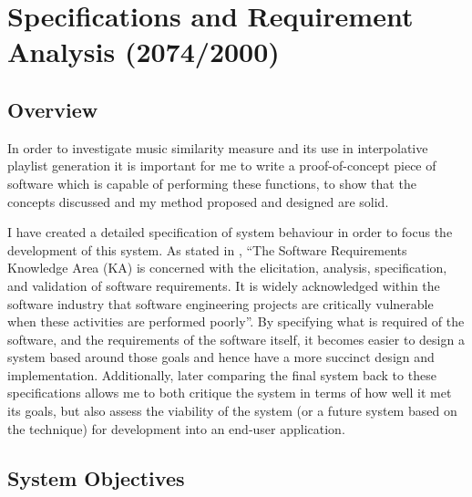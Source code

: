 %
%
\newcommand{\objective}[1]{
	\subsubsection{#1}
}
\chapter{Specifications and Requirement Analysis (2074/2000)}
\section{Overview}
In order to investigate music similarity measure and its use in interpolative playlist generation it is important for me to write a proof-of-concept piece of software which is capable of performing these functions, to show that the concepts discussed and my method proposed and designed are solid.

I have created a detailed specification of system behaviour in order to focus the development of this system. As stated in \citet{Bourque2004}, ``The Software Requirements Knowledge Area (KA) is concerned with the elicitation, analysis, specification, and validation of software requirements. It is widely acknowledged within the software industry that software engineering projects are critically vulnerable when these activities are performed poorly''. By specifying what is required of the software, and the requirements of the software itself, it becomes easier to design a system based around those goals and hence have a more succinct design and implementation. Additionally, later comparing the final system back to these specifications allows me to both critique the system in terms of how well it met its goals, but also assess the viability of the system (or a future system based on the technique) for development into an end-user application.
\section{System Objectives}
